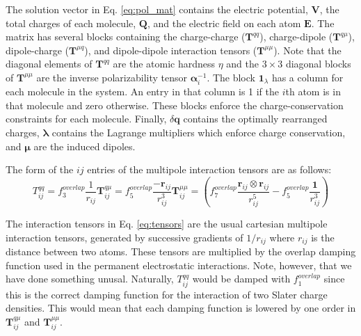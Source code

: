\documentclass[journal=jacsat,manuscript=article]{achemso}
\begin{document}
The solution vector in Eq. \ref{eq:pol_mat} contains the electric potential,
$\bm{V}$, the total charges of each molecule, $\bm{Q}$, and the electric
field on each atom $\bm{E}$. The matrix has several blocks containing the
charge-charge ($\bm{T}^{qq}$), charge-dipole ($\bm{T}^{q\mu}$),
dipole-charge ($\bm{T}^{\mu q}$), and dipole-dipole interaction tensors ($\bm{T}^{\mu\mu}$).
Note that the diagonal elements of $\bm{T}^{qq}$ are the atomic hardness $\eta$ and
the $3\times 3$ diagonal blocks of $\bm{T}^{\mu\mu}$ are the inverse polarizability tensor
$\bm{\alpha}_i^{-1}$. The block $\bm{1}_\lambda$ has a column for each molecule in the system.
An entry in that column is 1 if the $i$th atom is in that molecule and zero otherwise.
These blocks enforce the charge-conservation constraints for each molecule.
Finally, $\delta\bm{q}$ contains the optimally rearranged charges, $\bm{\lambda}$ contains
the Lagrange multipliers which enforce charge conservation, and $\bm{\mu}$ are the induced dipoles.

The form of the $ij$ entries of the multipole interaction tensors are as follows:
\begin{subequations}
  \begin{equation}
    T^{qq}_{ij}=f_3^{overlap}\frac{1}{r_{ij}}
    \label{eq:tensors_a}
  \end{equation}
  \begin{equation}
  \bm{T}^{q\mu}_{ij}=f_5^{overlap}\frac{-\bm{r}_{ij}}{r_{ij}^3}
    \label{eq:tensors_b}
  \end{equation}
  \begin{equation}
  \bm{T}^{\mu\mu}_{ij}=\left(f_7^{overlap}\frac{\bm{r}_{ij}\otimes\bm{r}_{ij}}{r_{ij}^5}-f_5^{overlap}\frac{\bm{1}}{r_{ij}^3}\right)
    \label{eq:tensors_c}
  \end{equation}
  \label{eq:tensors}
\end{subequations}

The interaction tensors in Eq. \ref{eq:tensors} are the usual cartesian multipole interaction
tensors, generated by successive gradients of $1/r_{ij}$ where $r_{ij}$ is the distance between
two atoms. These tensors are multiplied by the overlap damping function used in the permanent electrostatic
interactions. Note, however, that we have done something unusal. Naturally, $T^{qq}_{ij}$ would be damped
with $f_1^{overlap}$ since this is the correct damping function for the interaction of two
Slater charge densities. This would mean that each damping function is lowered by one order
in $\bm{T}^{q\mu}_{ij}$ and $\bm{T}^{\mu\mu}_{ij}$.
\end{document}
